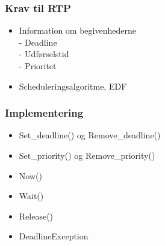\documentclass[12pt]{beamer}
\begin{document}
\begin{frame}
  \frametitle{Krav til RTP}
  \begin{itemize}   
	\item Information om begivenhederne\\
  - Deadline \\
  - Udførselstid\\
  - Prioritet
	\item Scheduleringsalgoritme, EDF
  \end{itemize}
\end{frame}

\begin{frame}
  \frametitle{Implementering}
  \begin{itemize}   
    \item Set\_deadline() og Remove\_deadline()
    \item Set\_priority() og Remove\_priority()
    \item Now()
    \item Wait()
    \item Release()
	  \item DeadlineException
  \end{itemize}
\end{frame}
\end{document}

